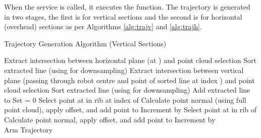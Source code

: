 When the service is called, it executes the  function. The trajectory is generated in two stages, the first is for vertical sections and the second is for horizontal (overhead) sections as per Algorithms \ref{alg:trajv} and \ref{alg:trajh}.
\begin{algorithm}[H]
\caption{Trajectory Generation Algorithm (Vertical Sections)}
\label{alg:trajv}
\begin{algorithmic}[1]
\begin{raggedright}
\State Extract intersection between horizontal plane (at ) and point cloud selection
\State Sort extracted line (using  for downsampling)
\State Extract intersection between vertical plane (passing through robot centre and point of sorted line at index ) and point cloud selection
\State Sort extracted line (using  for downsampling)
\State Add extracted line to 
\EndFor
\State Set  = 0
\State Select point at  in rib at index  of 
\State Calculate point normal (using full point cloud), apply offset, and add point to 
\EndFor
\State Increment  by 
\State Select point at  in rib  of 
\State Calculate point normal, apply offset, and add point to 
\EndFor
\State Increment  by 
\EndWhile
\EndFunction\\
\Return Arm Trajectory
\end{raggedright}
\end{algorithmic}
\end{algorithm}
